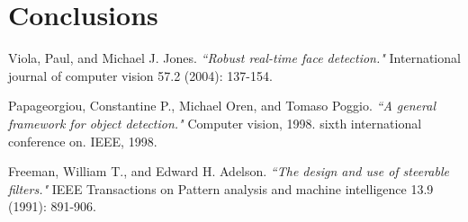 \documentclass[10pt,a4paper]{report}
\begin{document}
\section*{Conclusions}

\begin{thebibliography}{9}

Viola, Paul, and Michael J. Jones. \emph{``Robust real-time face detection."} International journal of computer vision 57.2 (2004): 137-154.

Papageorgiou, Constantine P., Michael Oren, and Tomaso Poggio. \emph{``A general framework for object detection."} Computer vision, 1998. sixth international conference on. IEEE, 1998.

Freeman, William T., and Edward H. Adelson. \emph{``The design and use of steerable filters."} IEEE Transactions on Pattern analysis and machine intelligence 13.9 (1991): 891-906.

\end{thebibliography}
\end{document}
